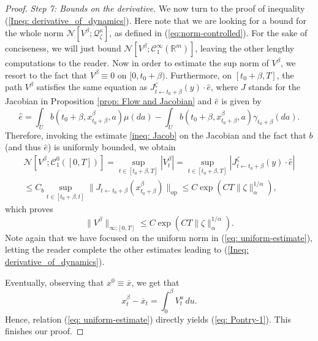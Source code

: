 \documentclass[12pt,reqno]{amsart}
\numberwithin{equation}{section}  %
\newcommand{\1}{{\bf 1}}
\newcommand{\2}{{\bf 2}}
\newcommand{\R}{\mathbb R}
\newcommand{\ga}{\gamma}
\newcommand{\lp}{\left(}
\newcommand{\rp}{\right)}
\theoremstyle{remark}
\theoremstyle{remark}
\begin{document}
\begin{proof}
\smallskip
\noindent
\textit{Step 7: Bounds on the derivative.} 
We now turn to the proof of inequality (\ref{Ineq: derivative_of_dynamics}). Here note that we are looking for a bound for the whole norm $\mathcal{N}\left[ V^{\beta};\mathcal{Q}_{\zeta}^{\kappa} \right]$, as defined in (\ref{eq:norm-controlled}). For the sake of conciseness, we will just bound $\mathcal{N}[V^{\beta}; \mathcal{C}_{1}^{\infty}(\R^m)]$, leaving the other lengthy computations to the reader. Now in order to estimate the sup norm of $V^{\beta}$, we resort to the fact that $V^{\beta}\equiv 0$ on $[0,t_{0}+\beta)$. Furthermore, on $[t_{0}+\beta,T]$, the path $V^{\beta}$ satisfies the same equation as $J^{\zeta}_{t\leftarrow t_{0}+\beta}(y)\cdot \hat{e}$, where $J$ stands for the Jacobian in Proposition \ref{prop: Flow and Jacobian} and $\hat{e}$ is given by
\begin{equation}
   \hat{e}= \int_{U}b(t_{0}+\beta,x^{\beta}_{t_{0}+\beta},a)\mu(da)-\int_{U}b(t_{0}+\beta,x^{\beta}_{t_{0}+\beta},a)\ga_{t_{0}+\beta}(da) .
\end{equation}
Therefore, invoking the estimate \eqref{ineq: Jacob} on the Jacobian and the fact that $b$ (and thus $\hat{e}$) is uniformly bounded, we obtain
\begin{multline*}
   \mathcal{N}[V^{\beta};\mathcal{C}_{1}^{0}([0,T])]=\sup_{t\in[t_{0}+\beta,T]}|V^{\beta}_{t}|
    =\sup_{t\in[t_{0}+\beta,T]}|J_{t\leftarrow t_{0}+\beta}^{\zeta}(y)\cdot \hat{e}|\\
   \leq C_{b}\sup_{t\in[t_{0}+\beta,t]}\|J_{t\leftarrow t_{0}+\beta}(x^{\beta}_{t_{0}+\beta})\|_{\mathrm{op}}
    \leq C\exp\lp CT\|\zeta\|_{\alpha}^{1/\alpha} \rp,
    \end{multline*} 
    which proves
    \begin{equation}\|V^{\beta}\|_{\infty;[0,T]}\leq C\exp \lp C T \|\zeta\|_{\alpha}^{1/\alpha} \rp.
\label{eq: uniform-estimate}    \end{equation}
Note again that we have focused on the uniform norm in (\ref{eq: uniform-estimate}), letting the reader complete the other estimates leading to (\ref{Ineq: derivative_of_dynamics}).

Eventually, observing that $x^{0}\equiv \overline{x}$, we get that 
\begin{equation}\label{eq: FTC x}x^{\beta}_{t}-\overline{x}_{t}=\int_{0}^{\beta}V_{t}^{u} \, du.\end{equation}
Hence, relation (\ref{eq: uniform-estimate}) directly yields (\ref{eq: Pontry-1}). This finishes our proof.\end{proof}
\end{document}
